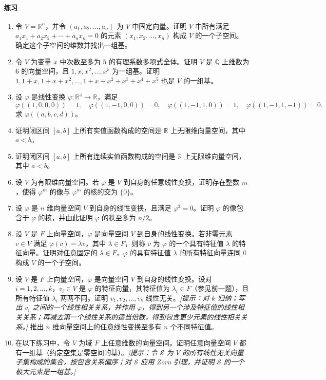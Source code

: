\paragraph{练习}
\begin{enumerate}[label=\arabic*.]
\item 令 $V=\mathbb R^n$，并令 $(a_1,a_2,\ldots,a_n)$ 为 $V$ 中固定向量。证明 $V$ 中所有满足 $a_1x_1+a_2x_2+\cdots+a_nx_n=0$ 的元素 $(x_1,x_2,\ldots,x_n)$ 构成 $V$ 的一个子空间。确定这个子空间的维数并找出一组基。
\item 令 $V$ 为变量 $x$ 中次数至多为 $5$ 的有理系数多项式全体。证明 $V$ 是 $\mathbb Q$ 上维数为 $6$ 的向量空间，且 $1,x,x^2,\ldots,x^5$ 为一组基。证明 $1,1+x,1+x+x^2,\ldots,1+x+x^2+x^3+x^4+x^5$ 也是 $V$ 的一组基。
\item 设 $\varphi$ 是线性变换 $\varphi:\mathbb R^4\to \mathbb R$，满足
\[
\varphi((1,0,0,0))=1,
\quad \varphi((1,-1,0,0))=0,
\quad \varphi((1,-1,1,0))=1,
\quad \varphi((1,-1,1,-1))=0.
\]
求 $\varphi((a,b,c,d))$。
\item 证明闭区间 $[a,b]$ 上所有实值函数构成的空间是 $\mathbb R$ 上无限维向量空间，其中 $a<b$。
\item 证明闭区间 $[a,b]$ 上所有连续实值函数构成的空间是 $\mathbb R$ 上无限维向量空间，其中 $a<b$。
\item 设 $V$ 为有限维向量空间。若 $\varphi$ 是 $V$ 到自身的任意线性变换，证明存在整数 $m$，使得 $\varphi^m$ 的像与 $\varphi^m$ 的核的交为 $\{0\}$。
\item 设 $\varphi$ 是 $n$ 维向量空间 $V$ 到自身的线性变换，且满足 $\varphi^2=0$。证明 $\varphi$ 的像包含于 $\varphi$ 的核，并由此证明 $\varphi$ 的秩至多为 $n/2$。
\item 设 $V$ 是 $F$ 上向量空间，$\varphi$ 是向量空间 $V$ 到自身的线性变换。若非零元素 $v\in V$ 满足 $\varphi(v)=\lambda v$，其中 $\lambda\in F$，则称 $v$ 为 $\varphi$ 的一个具有特征值 $\lambda$ 的特征向量。证明对任意固定的 $\lambda\in F$，$\varphi$ 的具有特征值 $\lambda$ 的所有特征向量连同 $0$ 构成 $V$ 的一个子空间。
\item 设 $V$ 是 $F$ 上向量空间，$\varphi$ 是向量空间 $V$ 到自身的线性变换。设对 $i=1,2,\ldots,k$，$v_i\in V$ 是 $\varphi$ 的特征向量，其特征值为 $\lambda_i\in F$（参见前一题），且所有特征值 $\lambda_i$ 两两不同。证明 $v_1,v_2,\ldots,v_k$ 线性无关。\emph{[提示：对 $k$ 归纳；写出 $v_i$ 之间的一个线性相关关系，并作用 $\varphi$，得到另一个涉及特征值的线性相关关系；再减去第一个线性关系的适当倍数，得到包含更少元素的线性相关关系。]} 推出 $n$ 维向量空间上的任意线性变换至多有 $n$ 个不同特征值。
\item 在以下练习中，令 $V$ 为域 $F$ 上任意维数的向量空间。证明任意向量空间 $V$ 都有一组基（约定空集是零空间的基）。\emph{[提示：令 $\mathcal S$ 为 $V$ 的所有线性无关向量子集构成的集合，按包含关系偏序；对 $\mathcal S$ 应用 Zorn 引理，并证明 $\mathcal S$ 的一个极大元素是一组基。]}

\end{enumerate}
